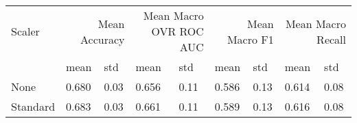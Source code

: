 \begin{tabular}{lllllllll}
\toprule
Scaler & \multicolumn{2}{r}{Mean Accuracy} & \multicolumn{2}{r}{Mean Macro OVR ROC AUC} & \multicolumn{2}{r}{Mean Macro F1} & \multicolumn{2}{r}{Mean Macro Recall} \\
 & mean & std & mean & std & mean & std & mean & std \\
\midrule
None & 0.680 & 0.03 & 0.656 & 0.11 & 0.586 & 0.13 & 0.614 & 0.08 \\
Standard & 0.683 & 0.03 & 0.661 & 0.11 & 0.589 & 0.13 & 0.616 & 0.08 \\
\bottomrule
\end{tabular}
